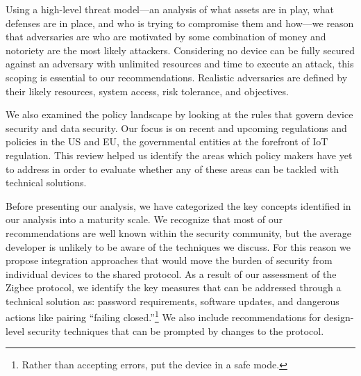 Using a high-level threat model---an analysis of what assets are in play, what defenses are in place, and who is trying to compromise them and how---we reason that adversaries are who are motivated by some combination of money and notoriety are the most likely attackers. 
Considering no device can be fully secured against an adversary with unlimited resources and time to execute an attack, this scoping is essential to our recommendations. 
Realistic adversaries are defined by their likely resources, system access, risk tolerance, and objectives.

We also examined the policy landscape by looking at the rules that govern device security and data security.
Our focus is on recent and upcoming regulations and policies in the US and EU, the governmental entities at the forefront of IoT regulation.
This review helped us identify the areas which policy makers have yet to address in order to evaluate whether any of these areas can be tackled with technical solutions.

Before presenting our analysis, we have categorized the key concepts identified in our analysis into a maturity scale.
We recognize that most of our recommendations are well known within the security community, but the average developer is unlikely to be aware of the techniques we discuss. 
For this reason we propose integration approaches that would move the burden of security from individual devices to the shared protocol.
As a result of our assessment of the Zigbee protocol, we identify the key measures that can be addressed through a technical solution as: password requirements, software updates, and dangerous actions like pairing ``failing closed.''\footnote{Rather than accepting errors, put the device in a safe mode.}
We also include recommendations for design-level security techniques that can be prompted by changes to the protocol.

